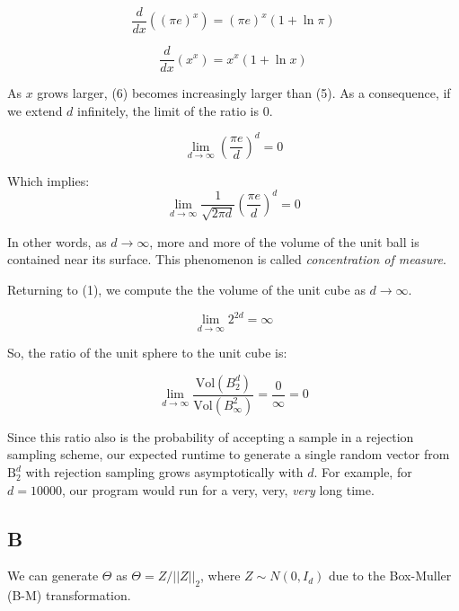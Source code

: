 \documentclass{article}
\begin{document}
\begin{equation}
\frac{d}{dx} ((\pi e)^x) = (\pi e)^x (1 + \ln \pi)
\end{equation}

\begin{equation}
\frac{d}{dx}(x^x) = x^x (1 + \ln x)
\end{equation}

As $x$ grows larger, (6) becomes increasingly larger than (5). As a consequence, if we extend $d$ infinitely, 
the limit of the ratio is 0.

\begin{equation}
\lim_{d \to \infty} \left( \frac{\pi e}{d} \right)^d = 0
\end{equation}

Which implies:
\begin{equation}
\lim_{d \to \infty} \frac{1}{\sqrt{2\pi d}} \left( \frac{\pi e}{d} \right)^d = 0
\end{equation}

In other words, as $d \to \infty$, more and more of the volume of the unit ball
is contained near its surface. This phenomenon is called \textit{concentration
of measure}.

\smallskip

Returning to (1), we compute the the volume of the unit cube as $d \to \infty$.

\begin{equation}
\lim_{d \to \infty} 2^{2d} = \infty
\end{equation}

So, the ratio of the unit sphere to the unit cube is:

\begin{equation}
\lim_{d \to \infty} \frac{\mathrm{Vol}(B^d_2)}{\mathrm{Vol}(B^2_\infty)} =
\frac{0}{\infty} = 0
\end{equation}

Since this ratio also is the probability of accepting a sample in a rejection sampling
scheme, our expected runtime to generate a single random vector from $\mathrm{B}^d_2$ with
rejection sampling grows asymptotically with $d$. For example, for $d=10000$, our
program would run for a very, very, \textit{very} long time. 

\subsection*{B}
We can generate $\Theta$ as $\Theta = Z / ||Z||_2$, where $Z \sim N(0, I_d)$ due
to the Box-Muller (B-M) transformation. 
\end{document}
